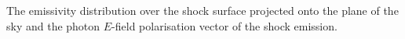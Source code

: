 The emissivity distribution over the shock surface projected onto the
plane of the sky and the photon $E$-field polarisation vector of the shock emission.